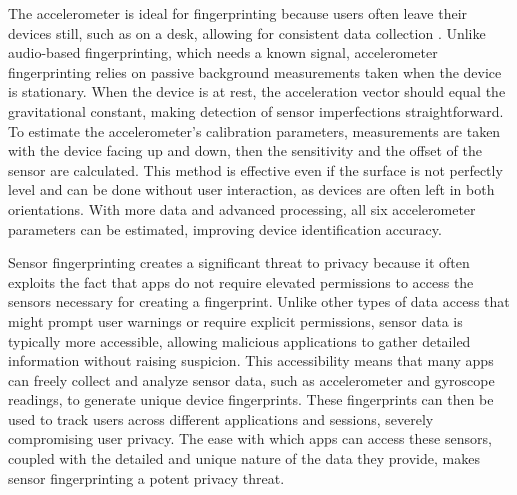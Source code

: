 \documentclass[11pt,
  oneside,openany,    %
]{scrreprt}
\begin{document}
The accelerometer is ideal for fingerprinting because users often leave their devices still, such as on a desk, allowing for consistent data collection \cite{DBLP:conf/ndss/DeyRXCN14, DBLP:conf/sp/ZhangBS19, DBLP:journals/comsur/BaldiniS17}.
Unlike audio-based fingerprinting, which needs a known signal, accelerometer fingerprinting relies on passive background measurements taken when the device is stationary.
When the device is at rest, the acceleration vector should equal the gravitational constant, making detection of sensor imperfections straightforward.
To estimate the accelerometer's calibration parameters, measurements are taken with the device facing up and down, then the sensitivity and the offset of the sensor are calculated.
This method is effective even if the surface is not perfectly level and can be done without user interaction, as devices are often left in both orientations.
With more data and advanced processing, all six accelerometer parameters can be estimated, improving device identification accuracy.

Sensor fingerprinting creates a significant threat to privacy because it often exploits the fact that apps do not require elevated permissions to access the sensors necessary for creating a fingerprint.
Unlike other types of data access that might prompt user warnings or require explicit permissions, sensor data is typically more accessible, allowing malicious applications to gather detailed information without raising suspicion. 
This accessibility means that many apps can freely collect and analyze sensor data, such as accelerometer and gyroscope readings, to generate unique device fingerprints.
These fingerprints can then be used to track users across different applications and sessions, severely compromising user privacy.
The ease with which apps can access these sensors, coupled with the detailed and unique nature of the data they provide, makes sensor fingerprinting a potent privacy threat.
\end{document}
